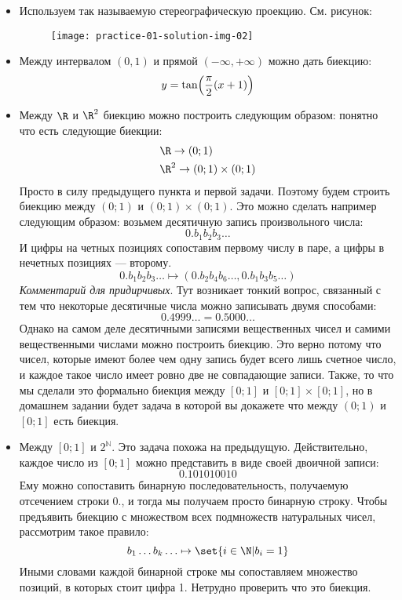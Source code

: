 \documentclass[a4paper,12pt,twoside]{article}
\begin{document}
\begin{solution}{}
    \begin{itemize}[noitemsep, topsep=0pt, parsep=3pt]
        \item Используем так называемую стереографическую проекцию. См. рисунок:
        \begin{figure}[h]
            \centering
            \texttt{[image: practice-01-solution-img-02]}
        \end{figure}

        \item Между интервалом $(0, 1)$ и прямой $(-\infty, +\infty)$ можно дать биекцию:
        $$
            y = \tan\mleft(\frac{\pi}{2}(x+1)\mright)
        $$
        \item Между $\R$ и $\R^2$ биекцию можно построить следующим образом: понятно что есть следующие биекции:
        \begin{align*}
            & \R \to (0; 1) \\
            & \R^2 \to (0; 1) \times (0; 1)
        \end{align*}
        Просто в силу предыдущего пункта и первой задачи. Поэтому будем строить биекцию между $(0;1)$ и $(0;1)\times(0;1)$. Это можно сделать например следующим образом: возьмем десятичную запись произвольного числа:
        $$
            0.b_1b_2b_3\ldots
        $$
        И цифры на четных позициях сопоставим первому числу в паре, а цифры в нечетных позициях --- второму.
        $$
            0.b_1b_2b_3\ldots \mapsto (0.b_2b_4b_6\ldots, 0.b_1b_3b_5\ldots)
        $$
        \textit{Комментарий для придирчивых}. Тут возникает тонкий вопрос, связанный с тем что некоторые десятичные числа можно записывать двумя способами:
        $$
            0.4999\ldots = 0.5000\ldots 
        $$
        Однако на самом деле десятичными записями вещественных чисел и самими вещественными числами можно построить биекцию. Это верно потому что чисел, которые имеют более чем одну запись будет всего лишь счетное число, и каждое такое число имеет ровно две не совпадающие записи. Также, то что мы сделали это формально биекция между $[0; 1]$ и $[0; 1] \times [0; 1]$, но в домашнем задании будет задача в которой вы докажете что между $(0; 1)$ и $[0; 1]$ есть биекция. 

        \item Между $[0; 1]$ и $2^{\mathbb{N}}$. Это задача похожа на предыдущую. Действительно, каждое число из $[0; 1]$ можно представить в виде своей двоичной записи:
        $$
            0.101010010 
        $$
        Ему можно сопоставить бинарную последовательность, получаемую отсечением строки $0.$, и тогда мы получаем просто бинарную строку. Чтобы предъявить биекцию с множеством всех подмножеств натуральных чисел, рассмотрим такое правило:
        $$
            b_1 \ldots b_k \ldots \mapsto \set{i \in \N | b_i = 1}
        $$ 
        Иными словами каждой бинарной строке мы сопоставляем множество позиций, в которых стоит цифра 1. Нетрудно проверить что это биекция.
    \end{itemize}
\end{solution}
\end{document}
